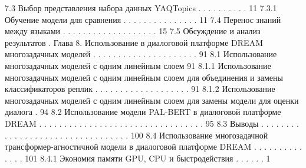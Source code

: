 7.3 Выбор представления набора данных YAQTopics . . . . . . . . . . 11
7.3.1 Обучение модели для сравнения . . . . . . . . . . . . . . . 11
7.4 Перенос знаний между языками . . . . . . . . . . . . . . . . . . . 15
7.5 Обсуждение и анализ результатов .
Глава 8. Использование в диалоговой платформе DREAM
многозадачных моделей . . . . . . . . . . . . . . . . . . . . . 91
8.1 Использование многозадачных моделей с одним линейным слоем 91
8.1.1 Использование многозадачных моделей с одним
линейным слоем для объединения и замены
классификаторов реплик . . . . . . . . . . . . . . . . . . . 91
8.1.2 Использование многозадачных моделей с одним
линейным слоем для замены модели для оценки диалога . 94
8.2 Использование модели PAL-BERT в диалоговой платформе
DREAM . . . . . . . . . . . . . . . . . . . . . . . . . . . . . . . . . 95
8.3 Выводы . . . . . . . . . . . . . . . . . . . . . . . . . . . . . . . . . 100
8.4 Использование многозадачной трансформер-агностичной
модели в диалоговой платформе DREAM . . . . . . . . . . . . . . 101
8.4.1 Экономия памяти GPU, CPU и быстродействия . . . . . . 1
\fi

